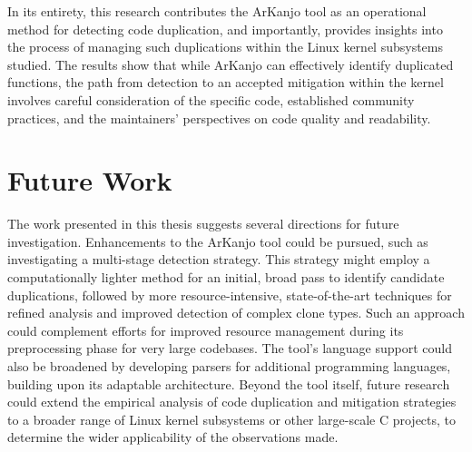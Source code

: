 In its entirety, this research contributes the ArKanjo tool as an operational 
method for detecting code duplication, and importantly, provides insights into 
the process of managing such duplications within the Linux kernel subsystems 
studied. The results show that while ArKanjo can effectively identify 
duplicated functions, the path from detection to an accepted mitigation within 
the kernel involves careful consideration of the specific code, established 
community practices, and the maintainers' perspectives on code quality and readability.

\section{Future Work}

The work presented in this thesis suggests several directions for future investigation. 
Enhancements to the ArKanjo tool could be pursued, such as investigating a multi-stage 
detection strategy. This strategy might employ a computationally lighter method for an 
initial, broad pass to identify candidate duplications, followed by more 
resource-intensive, state-of-the-art techniques for refined analysis and improved 
detection of complex clone types. Such an approach could complement efforts for 
improved resource management during its preprocessing phase for very large codebases.
The tool's language support could also be broadened by
developing parsers for additional programming languages, building upon its adaptable
architecture. Beyond the tool itself, future research could extend the empirical
analysis of code duplication and mitigation strategies to a broader range of Linux kernel 
subsystems or other large-scale C projects, to determine the wider 
applicability of the observations made.
